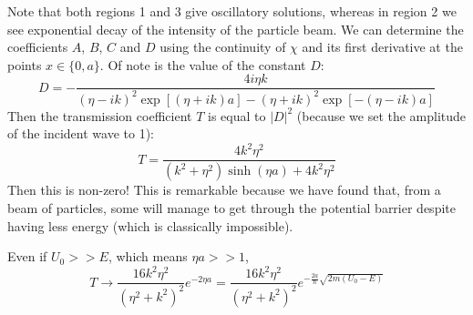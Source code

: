 \documentclass[../Main.tex]{subfiles}
\begin{document}
Note that both regions 1 and 3 give oscillatory solutions, whereas in region 2 we see exponential decay of the intensity of the particle beam.
We can determine the coefficients $A$, $B$, $C$ and $D$ using the continuity of $\chi$ and its first derivative at the points $x \in \{0, a\}$. Of note is the value of the constant $D$:
\begin{equation*}
    D = -\frac{4i\eta k}{(\eta - ik)^2 \exp\left[(\eta + i k)a\right] - (\eta + ik)^2 \exp\left[-(\eta - ik)a\right]}
\end{equation*}
Then the transmission coefficient $T$ is equal to $|D|^2$ (because we set the amplitude of the incident wave to 1):
\begin{equation*}
    T = \frac{4k^2 \eta^2}{(k^2 + \eta^2) \sinh(\eta a) + 4k^2 \eta^2}
\end{equation*}
Then this is non-zero! This is remarkable because we have found that, from a beam of particles, some will manage to get through the potential barrier despite having less energy (which is classically impossible).

Even if $U_0 >> E$, which means $\eta a >> 1$,
\begin{equation*}
    T \to \frac{16k^2\eta^2}{(\eta^2 + k^2)^2} e^{-2\eta a} = \frac{16k^2\eta^2}{(\eta^2 + k^2)^2} e^{-\frac{2a}{\hbar}\sqrt{2m(U_0 - E)}}
\end{equation*}
\end{document}
